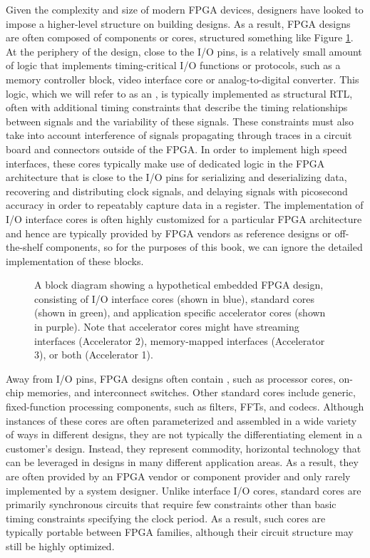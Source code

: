 Given the complexity and size of modern FPGA devices, designers have looked to impose a higher-level structure on building designs.  As a result, FPGA designs are often composed of components or \glspl{core}, structured something like Figure \ref{fig:designTemplate}.  At the periphery of the design, close to the I/O pins, is a relatively small amount of logic that implements timing-critical I/O functions or protocols, such as a memory controller block, video interface core or analog-to-digital converter.  This logic, which we will refer to as an , is typically implemented as structural RTL, often with additional timing constraints that describe the timing relationships between signals and the variability of these signals.   These constraints must also take into account interference of signals propagating through traces in a circuit board and connectors outside of the FPGA.  In order to implement high speed interfaces, these cores typically make use of dedicated logic in the FPGA architecture that is close to the I/O pins for serializing and deserializing data, recovering and distributing clock signals, and delaying signals with picosecond accuracy in order to repeatably capture data in a register.  The implementation of I/O interface cores is often highly customized for a particular FPGA architecture and hence are typically provided by FPGA vendors as reference designs or off-the-shelf components, so for the purposes of this book, we can ignore the detailed implementation of these blocks.

\begin{figure}
\centering
\def\svgwidth{\columnwidth}

\caption{A block diagram showing a hypothetical embedded FPGA design, consisting of I/O interface cores (shown in blue), standard cores (shown in green), and application specific accelerator cores (shown in purple).  Note that accelerator cores might have streaming interfaces (Accelerator 2), memory-mapped interfaces (Accelerator 3), or both (Accelerator 1). }
\label{fig:designTemplate}
\end{figure}

Away from I/O pins, FPGA designs often contain , such as processor cores, on-chip memories, and interconnect switches.   Other standard cores include generic, fixed-function processing components, such as filters, FFTs, and codecs.  Although instances of these cores are often parameterized and assembled in a wide variety of ways in different designs, they are not typically the differentiating element in a customer's design.  Instead, they represent commodity, horizontal technology that can be leveraged in designs in many different application areas.   As a result, they are often provided by an FPGA vendor or component provider and only rarely implemented by a system designer.  Unlike interface I/O cores, standard cores are primarily synchronous circuits that require few constraints other than basic timing constraints specifying the clock period.  As a result, such cores are typically portable between FPGA families, although their circuit structure may still be highly optimized.

